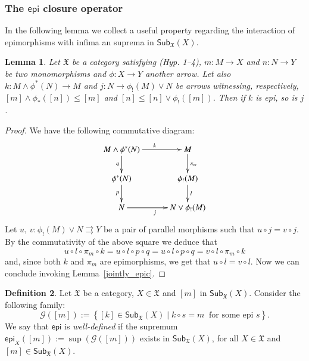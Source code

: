 \documentclass[12pt]{article}
\newtheorem{lemma}{Lemma}[section]
\theoremstyle{definition}
\newtheorem{definition}[lemma]{Definition}
\def\X{\mathfrak X}
\def\G{\mathcal{G}}
\numberwithin{equation}{section}
\newcommand{\catname}[1]{\mathbf{#1}}
\newcommand{\sub}[1]{\mathsf{Sub}_{\catname{#1}}}
\def\epi{\mathsf{epi}}
\begin{document}
\subsubsection{The $\mathsf{epi}$ closure operator}

 In the following lemma we collect a useful property regarding the interaction of epimorphisms with infima an suprema in $\sub{\X}(X)$.


\begin{lemma}\label{lem_tech_before_epi}
	Let $\X$ be a category satisfying (Hyp. 1--4), $m\colon M\rightarrow X$ and $n\colon N\rightarrow Y$ be two monomorphisms and $\phi\colon X\rightarrow Y$ another arrow. Let also $k:M\wedge \phi^*(N)\to M$ and $j:N\to \phi_!(M)\vee N$ be arrows witnessing, 
	respectively, $[m]\wedge \phi_*([n])\leq [m]$ and  $[n]\leq [n]\vee \phi_{!}([m])$.
	Then if $k$ is epi, so is $j$. 
\end{lemma} 
\begin{proof}We have the following commutative diagram:
	\[
	\xymatrix@C=30pt@R=20pt{
		M\wedge\phi^*(N)\ar[d]_{q}\ar[r]^{k}&M\ar[d]^{\pi_m}\\
		\phi^*(N)\ar[d]_{p}&\phi_!(M)\ar[d]^{l}\\
		N\ar[r]_{j}&N\vee\phi_!(M)
	}
	\]
	Let $u,\, v\colon \phi_!(M)\vee N\rightrightarrows Y$ be a pair of parallel morphisms   such that $u\circ j =v \circ j$. By the commutativity of the above square we deduce that
	\[
	u\circ l\circ \pi_m\circ k=u\circ l\circ p\circ q =u\circ l\circ p\circ q=v\circ l\circ \pi_m\circ k
	\]
	and, since both $k$ and $\pi_m$ are epimorphisms, we get that $u\circ l=v\circ l$. Now we can conclude invoking Lemma~\ref{jointly_epic}.
\end{proof}

\begin{definition}\label{epi_def}
	Let $\X$ be a category, $X\in \X$ and $[m]$ in $\sub\X(X)$. Consider the following family:
	\[
	\G([m]):=\left\{[k]\in\sub\X(X) \mid k\circ s=m\ \text{ for some epi } s\right\}.
	\]
	We say that $\epi$ is {\em well-defined} if the supremum $\epi_X([m]):=\sup (\G([m]))$ exists in $\sub\X(X)$, for all $X\in \X$ and $[m]\in \sub\X(X)$.
\end{definition}
\end{document}
